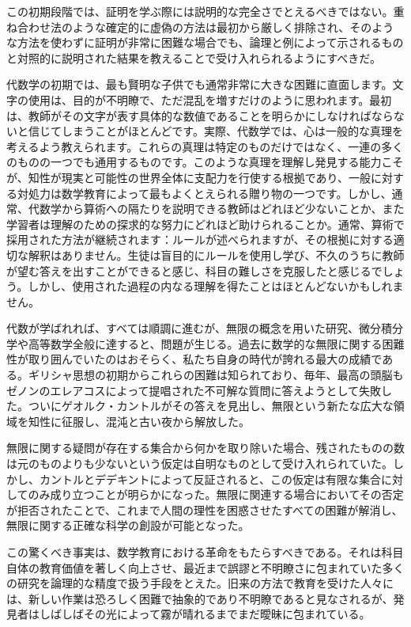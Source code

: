 \documentclass[a4paper,11pt,openany]{ltjsbook}
\begin{document}
この初期段階では、証明を学ぶ際には説明的な完全さでとえるべきではない。重ね合わせ法のような確定的に虚偽の方法は最初から厳しく排除され、そのような方法を使わずに証明が非常に困難な場合でも、論理と例によって示されるものと対照的に説明された結果を教えることで受け入れられるようにすべきだ。

代数学の初期では、最も賢明な子供でも通常非常に大きな困難に直面します。文字の使用は、目的が不明瞭で、ただ混乱を増すだけのように思われます。最初は、教師がその文字が表す具体的な数値であることを明らかにしなければならないと信じてしまうことがほとんどです。実際、代数学では、心は一般的な真理を考えるよう教えられます。これらの真理は特定のものだけではなく、一連の多くのものの一つでも通用するものです。このような真理を理解し発見する能力こそが、知性が現実と可能性の世界全体に支配力を行使する根拠であり、一般に対する対処力は数学教育によって最もよくとえられる贈り物の一つです。しかし、通常、代数学から算術への隔たりを説明できる教師はどれほど少ないことか、また学習者は理解のための探求的な努力にどれほど助けられることか。通常、算術で採用された方法が継続されます：ルールが述べられますが、その根拠に対する適切な解釈はありません。生徒は盲目的にルールを使用し学び、不久のうちに教師が望む答えを出すことができると感じ、科目の難しさを克服したと感じるでしょう。しかし、使用された過程の内なる理解を得たことはほとんどないかもしれません。

代数が学ばれれば、すべては順調に進むが、無限の概念を用いた研究、微分積分学や高等数学全般に達すると、問題が生じる。過去に数学的な無限に関する困難性が取り囲んでいたのはおそらく、私たち自身の時代が誇れる最大の成績である。ギリシャ思想の初期からこれらの困難は知られており、毎年、最高の頭脳もゼノンのエレアコスによって提唱された不可解な質問に答えようとして失敗した。ついにゲオルク・カントルがその答えを見出し、無限という新たな広大な領域を知性に征服し、混沌と古い夜から解放した。

無限に関する疑問が存在する集合から何かを取り除いた場合、残されたものの数は元のものよりも少ないという仮定は自明なものとして受け入れられていた。しかし、カントルとデデキントによって反証されると、この仮定は有限な集合に対してのみ成り立つことが明らかになった。無限に関連する場合においてその否定が拒否されたことで、これまで人間の理性を困惑させたすべての困難が解消し、無限に関する正確な科学の創設が可能となった。

この驚くべき事実は、数学教育における革命をもたらすべきである。それは科目自体の教育価値を著しく向上させ、最近まで誤謬と不明瞭さに包まれていた多くの研究を論理的な精度で扱う手段をとえた。旧来の方法で教育を受けた人々には、新しい作業は恐ろしく困難で抽象的であり不明瞭であると見なされるが、発見者はしばしばその光によって霧が晴れるまでまだ曖昧に包まれている。
\end{document}
